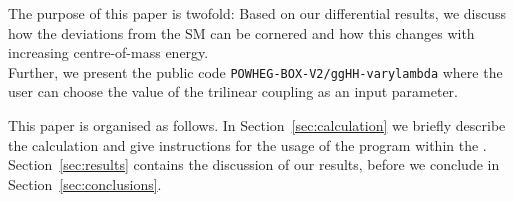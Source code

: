 The purpose of this paper is twofold: Based on our differential results, we discuss how the deviations from the SM can be cornered and how this changes with increasing centre-of-mass energy. \\
Further, we present the public code {\tt POWHEG-BOX-V2/ggHH-varylambda} where the user can choose the value of the trilinear coupling as an input parameter.

This paper is organised as follows. In Section~\ref{sec:calculation} we briefly describe the calculation and give instructions for the usage of the program within the \powhegbox. Section~\ref{sec:results} contains the discussion of our results, before we conclude in Section~\ref{sec:conclusions}.
